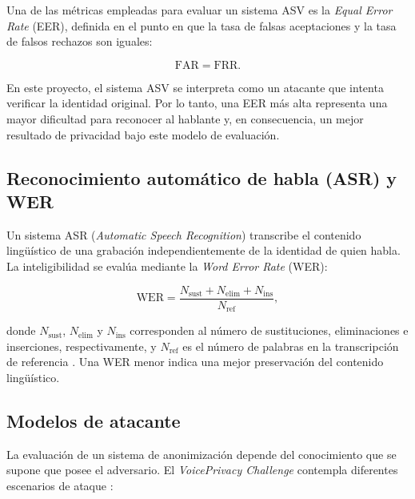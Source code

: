 \documentclass[10pt,twocolumn]{article}
\begin{document}
Una de las métricas empleadas para evaluar un sistema ASV es la
\textit{Equal Error Rate} (EER), definida en el punto en que la tasa de falsas
aceptaciones y la tasa de falsos rechazos son iguales:

\begin{equation}
    \mathrm{FAR} = \mathrm{FRR}.
\end{equation}

En este proyecto, el sistema ASV se interpreta como un atacante que intenta
verificar la identidad original. Por lo tanto, una EER más alta representa una
mayor dificultad para reconocer al hablante y, en consecuencia, un mejor
resultado de privacidad bajo este modelo de evaluación.

\subsection{Reconocimiento automático de habla (ASR) y WER}

Un sistema ASR (\textit{Automatic Speech Recognition}) transcribe el contenido
lingüístico de una grabación independientemente de la identidad de quien habla.
La inteligibilidad se evalúa mediante la \textit{Word Error Rate} (WER):

\begin{equation}
    \mathrm{WER}
    =
    \frac{
        N_{\mathrm{sust}}
        +
        N_{\mathrm{elim}}
        +
        N_{\mathrm{ins}}
    }{
        N_{\mathrm{ref}}
    },
    \label{eq:wer}
\end{equation}

donde $N_{\mathrm{sust}}$, $N_{\mathrm{elim}}$ y $N_{\mathrm{ins}}$ corresponden
al número de sustituciones, eliminaciones e inserciones, respectivamente, y
$N_{\mathrm{ref}}$ es el número de palabras en la transcripción de referencia
\cite{deng2023}. Una WER menor indica una mejor preservación del contenido
lingüístico.

\subsection{Modelos de atacante}

La evaluación de un sistema de anonimización depende del conocimiento que se
supone que posee el adversario. El \textit{VoicePrivacy Challenge} contempla
diferentes escenarios de ataque \cite{patino2021,tomashenko2024}:
\end{document}
